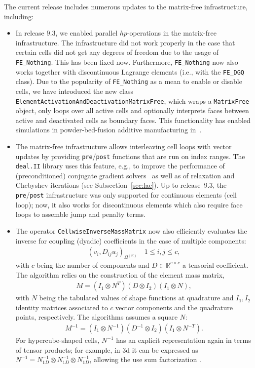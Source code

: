\documentclass{ansarticle-preprint}
\newcommand{\specialword}[1]{\texttt{#1}}
\newcommand{\dealii}{{\specialword{deal.II}}\xspace}
\begin{document}
The current release includes numerous updates to the matrix-free
infrastructure, including:
\begin{itemize}
\item In release 9.3, we enabled parallel $hp$-operations in the matrix-free infrastructure.
The infrastructure did not work properly in the case that certain cells
did not get any degrees of freedom due to the usage of \texttt{FE\_Nothing}. This has been
fixed now. Furthermore, \texttt{FE\_Nothing} now also works together
with discontinuous Lagrange elements (i.e., with the \texttt{FE\_DGQ} class). Due to the popularity of \texttt{FE\_Nothing} as a mean to enable
or disable cells, we have introduced the new class
\texttt{ElementActivationAndDeactivationMatrixFree}, which wraps a \texttt{MatrixFree} object, only loops over all
active cells and optionally interprets faces between active and deactivated cells
as boundary faces. This functionality has enabled simulations in powder-bed-fusion additive
manufacturing in~\cite{proell2023highly}.
\item The matrix-free infrastructure allows interleaving cell loops with vector updates
  by providing \texttt{pre}/\texttt{post} functions that are run on index ranges.  The \dealii
  library uses this feature, e.g., to improve the performance of (preconditioned)
conjugate gradient solvers~\cite{kronbichler2022cg} as well as of relaxation and Chebyshev iterations (see Subsection~\ref{sec:lac}).
Up to release~9.3, the \texttt{pre}/\texttt{post} infrastructure was only supported for
continuous elements (cell loop); now, it also works for discontinuous
elements which also require face loops to assemble jump and penalty terms.
\item The operator \texttt{CellwiseInverseMassMatrix} now also efficiently
evaluates the inverse for coupling (dyadic) coefficients in the case of multiple
components:
\begin{align*}
\left(v_i, D_{ij} u_j  \right)_{\Omega^{(K)}}
\quad  1\le i,j \le c,
\end{align*}
with $c$ being the number of components and $D\in \mathbb{R}^{c\times c}$ a tensorial
coefficient. The algorithm relies on the construction of the element mass matrix,
\begin{align*}
M =  ( I_1 \otimes N^T) (D \otimes I_2 ) ( I_1 \otimes N),
\end{align*}
with $N$ being the tabulated values of shape functions at quadrature and
$I_1,I_2$ identity matrices associated to $c$ vector components and the
quadrature points, respectively.
The algorithms assumes a square $N$:
\begin{align*}
M^{-1} =  ( I_1 \otimes N^{-1}) (D^{-1} \otimes I_2 ) ( I_1 \otimes N^{-T}).
\end{align*}
For hypercube-shaped cells, $N^{-1}$ has an explicit representation
again in terms of tensor products; for example, in 3d it can be
expressed as $N^{-1} = N_{1D}^{-1} \otimes N_{1D}^{-1} \otimes
N_{1D}^{-1}$, allowing the use sum factorization \cite{kronbichler2016comparison}.
\end{itemize}
\end{document}
